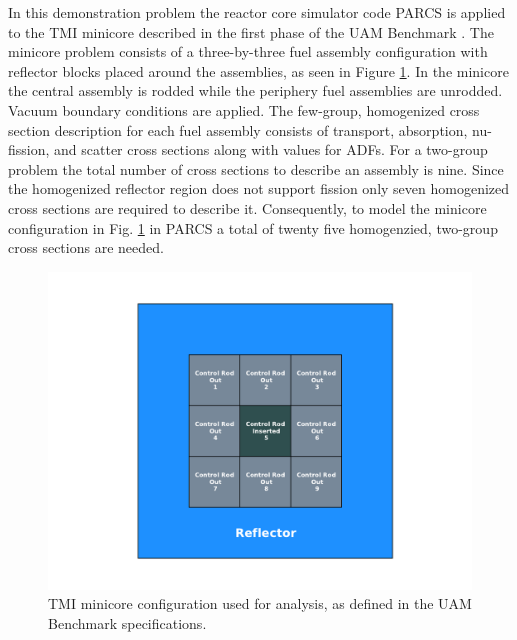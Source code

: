 In this demonstration problem the reactor core simulator code \ac{PARCS} \cite{PARCS} is applied to the \ac{TMI} minicore described in the first phase of the \ac{UAM} Benchmark \cite{UAM_Benchmark}. The minicore problem consists of a three-by-three fuel assembly configuration with reflector blocks placed around the assemblies, as seen in Figure \ref{fig:tmi_minicore}. In the minicore the central assembly is rodded while the periphery fuel assemblies are unrodded. Vacuum boundary conditions are applied. The few-group, homogenized cross section description for each fuel assembly consists of transport, absorption, nu-fission, and scatter cross sections along with values for \ac{ADFs}. For a two-group problem the total number of cross sections to describe an assembly is nine. Since the homogenized reflector region does not support fission only seven homogenized cross sections are required to describe it. Consequently, to model the minicore configuration in Fig. \ref{fig:tmi_minicore} in \ac{PARCS} a total of twenty five homogenzied, two-group cross sections are needed.  
\begin{figure}[!htb]
\caption{\label{fig:tmi_minicore}
\ac{TMI} minicore configuration used for analysis, as defined in the \ac{UAM} Benchmark specifications.}
 \begin{center}
  \includegraphics[scale=.75]{./Chapter3/tmi_minicore.pdf}
 \end{center}
\end{figure}  

